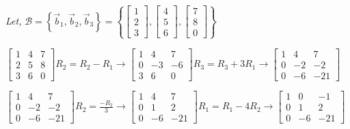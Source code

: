 \documentclass{article}
\begin{document}
{{\begin{center}
\begin{tikzpicture}
\end{tikzpicture}
\end{center}
 
}
\begin{center}
\textit{Let,}
$\mathcal{B} = \left\{\vec{b}_1,\vec{b}_2, \vec{b}_3\right\} = \left\{\begin{bmatrix} 
	1 \\
	2 \\
	3
\end{bmatrix},
\begin{bmatrix}
	4 \\
	5 \\
	6
\end{bmatrix},
\begin{bmatrix}
	7 \\
	8 \\
	0
\end{bmatrix} \right\}
$
\end{center}
\begin{center}
$\begin{bmatrix}
	1 & 4 & 7 \\
	2& 5 & 8 \\
	3 & 6 & 0
\end{bmatrix} R_{2} = R_{2} - R_{1} \rightarrow 
\begin{bmatrix}
	1 & 4 & 7 \\
	0 & -3 & -6 \\
	3 & 6& 0
\end{bmatrix} R_{3} = R_{3} + 3R_{1} \rightarrow 
\begin{bmatrix}
	1 & 4 & 7 \\
	0 & -2 & -2 \\
	0 & -6 & -21
\end{bmatrix}$ 
\end{center}

\begin{center}
	$
\begin{bmatrix}
	1 & 4 & 7 \\
	0 & -2 & -2 \\
	0 & -6 & -21
\end{bmatrix}  R_{2} = \frac{-R_2}{3}  \rightarrow 
\begin{bmatrix}
	1 & 4 & 7 \\
	0 & 1 & 2 \\
	0 & -6 & -21
\end{bmatrix}  R_{1} = R_{1} - 4R_{2}  \rightarrow
\begin{bmatrix}
	1 & 0 & -1 \\
	0 & 1 & 2 \\
	0 & -6 & -21
\end{bmatrix}$  


\end{center}}
\end{document}
